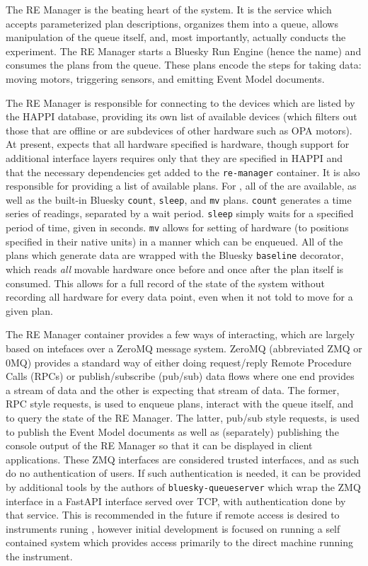 The RE Manager is the beating heart of the \biab system.
It is the service which accepts parameterized plan descriptions, organizes them into a queue, allows manipulation of the queue itself, and, most importantly, actually conducts the experiment.
The RE Manager starts a Bluesky Run Engine (hence the name) and consumes the plans from the queue.
These plans encode the steps for taking data: moving motors, triggering sensors, and emitting Event Model documents.

The RE Manager is responsible for connecting to the devices which are listed by the HAPPI database, providing its own list of available devices (which filters out those that are offline or are subdevices of other hardware such as OPA motors).
At present, \biab expects that all hardware specified is \yaq{} hardware, though support for additional interface layers requires only that they are specified in HAPPI and that the necessary dependencies get added to the \texttt{re-manager} container.
It is also responsible for providing a list of available plans.
For \biab, all of the \wrightplans are available, as well as the built-in Bluesky \texttt{count}, \texttt{sleep}, and \texttt{mv} plans.
\texttt{count} generates a time series of readings, separated by a wait period.
\texttt{sleep} simply waits for a specified period of time, given in seconds.
\texttt{mv} allows for setting of hardware (to positions specified in their native units) in a manner which can be enqueued.
All of the plans which generate data are wrapped with the Bluesky \texttt{baseline} decorator, which reads \textit{all} movable hardware once before and once after the plan itself is consumed.
This allows for a full record of the state of the system without recording all hardware for every data point, even when it not told to move for a given plan.

The RE Manager container provides a few ways of interacting, which are largely based on intefaces over a ZeroMQ\cite{} message system.
ZeroMQ (abbreviated ZMQ or 0MQ) provides a standard way of either doing request/reply Remote Procedure Calls (RPCs) or publish/subscribe (pub/sub) data flows where one end provides a stream of data and the other is expecting that stream of data.
The former, RPC style requests, is used to enqueue plans, interact with the queue itself, and to query the state of the RE Manager.
The latter, pub/sub style requests, is used to publish the Event Model documents as well as (separately) publishing the console output of the RE Manager so that it can be displayed in client applications.
These ZMQ interfaces are considered trusted interfaces, and as such do no authentication of users.
If such authentication is needed, it can be provided by additional tools by the authors of \texttt{bluesky-queueserver} which wrap the ZMQ interface in a FastAPI\cite{} interface served over TCP, with authentication done by that service.
This is recommended in the future if remote access is desired to instruments runing \biab, however initial development is focused on running a self contained system which provides access primarily to the direct machine running the instrument.

